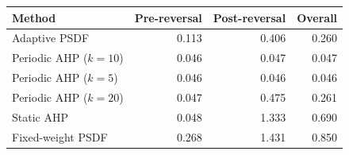 \begin{tabular}{lrrr}
\toprule
Method & Pre-reversal & Post-reversal & Overall \\
\midrule
Adaptive PSDF & 0.113 & 0.406 & 0.260 \\
Periodic AHP ($k=10$) & 0.046 & 0.047 & 0.047 \\
Periodic AHP ($k=5$) & 0.046 & 0.046 & 0.046 \\
Periodic AHP ($k=20$) & 0.047 & 0.475 & 0.261 \\
Static AHP & 0.048 & 1.333 & 0.690 \\
Fixed-weight PSDF & 0.268 & 1.431 & 0.850 \\
\bottomrule
\end{tabular}
